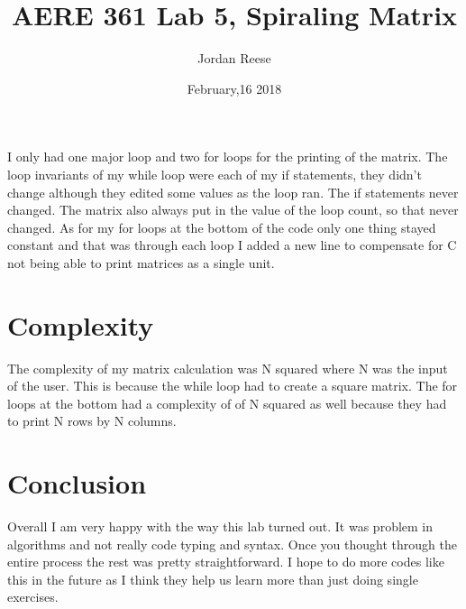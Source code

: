 \documentclass{article} \usepackage[utf8]{inputenc} \title{AERE 361 Lab 5, Spiraling Matrix} \author{Jordan Reese} \date{February,16 2018} \usepackage{listings} \usepackage{color} \definecolor{dkgreen}{rgb}{0,0.6,0}
\begin{document}
    I only had one major loop and two for loops for the printing of the matrix. The loop invariants of my while loop were each of my if statements, they didn't change although they edited some values as the loop ran. The if 
statements never changed. The matrix also always put in the value of the loop count, so that never changed. As for my for loops at the bottom of the code only one thing stayed constant and that was through each loop I added a new 
line to compensate for C not being able to print matrices as a single unit. \section{Complexity} The complexity of my matrix calculation was N squared where N was the input of the user. This is because the while loop had to 
create a square matrix. The for loops at the bottom had a complexity of of N squared as well because they had to print N rows by N columns. \section{Conclusion} Overall I am very happy with the way this lab turned out. It was 
problem in algorithms and not really code typing and syntax. Once you thought through the entire process the rest was pretty straightforward. I hope to do more codes like this in the future as I think they help us learn more than 
just doing single exercises.
\end{document}
